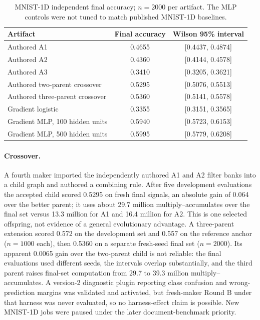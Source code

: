 \documentclass[11pt]{article}
\begin{document}
\begin{table}[!htbp]
\centering\small
\begin{tabular}{lcc}
\toprule
Artifact & Final accuracy & Wilson 95\% interval\\
\midrule
Authored A1 & 0.4655 & [0.4437, 0.4874]\\
Authored A2 & 0.4360 & [0.4144, 0.4578]\\
Authored A3 & 0.3410 & [0.3205, 0.3621]\\
Authored two-parent crossover & 0.5295 & [0.5076, 0.5513]\\
Authored three-parent crossover & 0.5360 & [0.5141, 0.5578]\\
\midrule
Gradient logistic & 0.3355 & [0.3151, 0.3565]\\
Gradient MLP, 100 hidden units & 0.5940 & [0.5723, 0.6153]\\
Gradient MLP, 500 hidden units & 0.5995 & [0.5779, 0.6208]\\
\bottomrule
\end{tabular}
\caption{MNIST-1D independent final accuracy; $n=2000$ per artifact. The MLP controls were not
tuned to match published MNIST-1D baselines.}
\label{tab:m1d}
\end{table}

\paragraph{Crossover.} A fourth maker imported the independently authored A1 and A2 filter banks
into a child graph and authored a combining rule. After five development evaluations the accepted
child scored 0.5295 on fresh final signals, an absolute gain of 0.064 over the better parent; it
uses about 29.7 million multiply--accumulates over the final set versus 13.3 million for A1 and
16.4 million for A2. This is one selected offspring, not evidence of a general evolutionary
advantage. A three-parent extension scored 0.572 on the development set and 0.557 on the
reference anchor ($n=1000$ each), then 0.5360 on a separate fresh-seed final set ($n=2000$). Its
apparent 0.0065 gain over the two-parent child is not reliable: the final evaluations used
different seeds, the intervals overlap substantially, and the third parent raises final-set
computation from 29.7 to 39.3 million multiply--accumulates. A version-2 diagnostic plugin
reporting class confusion and wrong-prediction margins was validated and activated, but
fresh-maker Round B under that harness was never evaluated, so no harness-effect claim is
possible. New MNIST-1D jobs were paused under the later document-benchmark priority.
\end{document}
